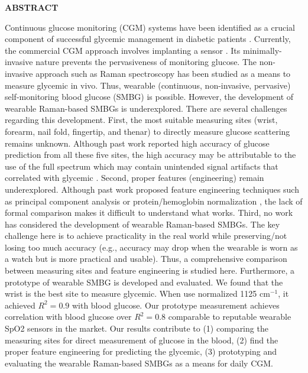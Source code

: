 {}

\begin{center}
    \large{\bf ABSTRACT}
\end{center}

\begin{sloppypar}
Continuous glucose monitoring (CGM) systems have been identified as a crucial component of successful glycemic management in diabetic patients \citep{continuous2021}.
Currently, the commercial CGM approach involves implanting a sensor \citep{CGMminimalinvasive}.
Its minimally-invasive nature prevents the pervasiveness of monitoring glucose.
The non-invasive approach such as Raman spectroscopy has been studied as a means to measure glycemic in vivo.
Thus, wearable (continuous, non-invasive, pervasive) self-monitoring blood glucose (SMBG) is possible.
However, the development of wearable Raman-based SMBGs is underexplored.
There are several challenges regarding this development.
First, the most suitable measuring sites (wrist, forearm, nail fold, fingertip, and thenar) to directly measure glucose scattering remains unknown.  Although past work reported high accuracy of glucose prediction from all these five sites, the high accuracy may be attributable to the use of the full spectrum which may contain unintended signal artifacts that correlated with glycemic \citep{directGlucose}.
Second, proper features (engineering) remain underexplored.
Although past work proposed feature engineering techniques such as principal component analysis \citep{ramanNailFold2019} or protein/hemoglobin normalization \citep{solutionGlucose,directGlucose}, the lack of formal comparison makes it difficult to understand what works.  
Third, no work has considered the development of wearable Raman-based SMBGs.
The key challenge here is to achieve practicality in the real world while preserving/not losing too much accuracy (e.g., accuracy may drop when the wearable is worn as a watch but is more practical and usable).
Thus, a comprehensive comparison between measuring sites and feature engineering is studied here.
Furthermore, a prototype of wearable SMBG is developed and evaluated.
We found that the wrist is the best site to measure glycemic. 
When use normalized 1125 $\text{cm}^{-1}$, it achieved $R^2 = 0.9$ with blood glucose.
Our prototype measurement achieves correlation with blood glucose over $R^2 = 0.8$ comparable to reputable wearable SpO2 sensors in the market. 
Our results contribute to 
(1) comparing the measuring sites for direct measurement of glucose in the blood, 
(2) find the proper feature engineering for predicting the glycemic,
(3) prototyping and evaluating the wearable Raman-based SMBGs as a means for daily CGM.
\end{sloppypar}
